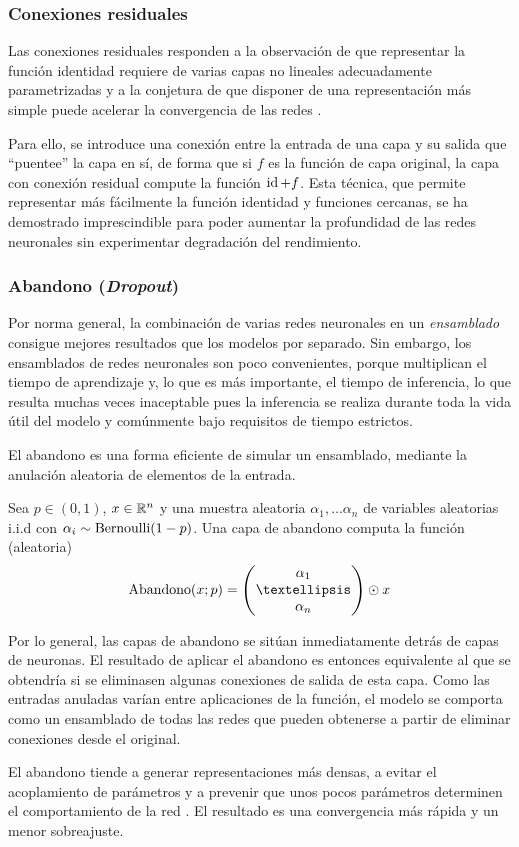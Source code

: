 \subsubsection{Conexiones residuales}
Las conexiones residuales responden a la observación de que representar la función identidad requiere de varias capas no lineales adecuadamente parametrizadas y a la conjetura de que disponer de una representación más simple puede acelerar la convergencia de las redes \cite{he2016deep}.

Para ello, se introduce una conexión entre la entrada de una capa y su salida que ``puentee'' la capa en sí, de forma que si \( f \) es la función de capa original, la capa con conexión residual compute la función \( \operatorname{id} + f \). Esta técnica, que permite representar más fácilmente la función identidad y funciones cercanas, se ha demostrado imprescindible para poder aumentar la profundidad de las redes neuronales sin experimentar degradación del rendimiento.

\subsubsection{Abandono (\textit{Dropout})}
Por norma general, la combinación de varias redes neuronales en un \textit{ensamblado} consigue mejores resultados que los modelos por separado. Sin embargo, los ensamblados de redes neuronales son poco convenientes, porque multiplican el tiempo de aprendizaje y, lo que es más importante, el tiempo de inferencia, lo que resulta muchas veces inaceptable pues la inferencia se realiza durante toda la vida útil del modelo y comúnmente bajo requisitos de tiempo estrictos.

El abandono es una forma eficiente de simular un ensamblado, mediante la anulación aleatoria de elementos de la entrada. 
\begin{definition}
    Sea \( p \in (0, 1) \), \( x \in \mathbb{R}^{n} \) y  una muestra aleatoria \( \alpha_{1}, … \alpha_{n} \) de variables aleatorias i.i.d con \( \alpha_{i} \sim \operatorname{Bernoulli}(1-p) \). Una capa de abandono computa la función (aleatoria)
    \[
        \dropout(x; p) = \begin{pmatrix} \alpha_{1} \\
        … \\
        \alpha_{n}
        \end{pmatrix} \odot x
    \]
\end{definition}

Por lo general, las capas de abandono se sitúan inmediatamente detrás de capas de neuronas. El resultado de aplicar el abandono es entonces equivalente al que se obtendría si se eliminasen algunas conexiones de salida de esta capa. Como las entradas anuladas varían entre aplicaciones de la función, el modelo se comporta como un ensamblado  de todas las redes que pueden obtenerse a partir de eliminar conexiones desde el original.

El abandono tiende a generar representaciones más densas, a evitar el acoplamiento de parámetros y a prevenir que unos pocos parámetros determinen el comportamiento de la red \cite{srivastava2014dropout}. El resultado es una convergencia más rápida y un menor sobreajuste. 
